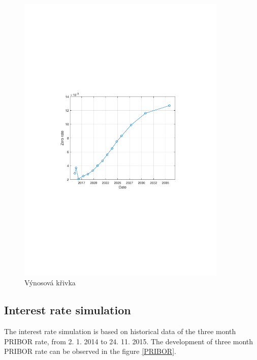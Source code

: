 \documentclass[a4paper,12pt]{report}
\theoremstyle{definition} \newtheorem{definice}[veta]{Definice}
\theoremstyle{remark}
\begin{document}
\begin{figure}[!htbp]
  \centering 
	\includegraphics[width=10cm, clip, trim= 125 280 110 270]{IMG/YieldCurveN.pdf}
  \caption{Výnosová křivka}  \label{YieldCurve}
\end{figure}

\subsection{Interest rate simulation}
The interest rate simulation is based on historical data of the three month PRIBOR rate, from 2. 1. 2014 to 24. 11. 2015.  
The development of three month PRIBOR rate can be observed in the figure \ref{PRIBOR}.
\end{document}
